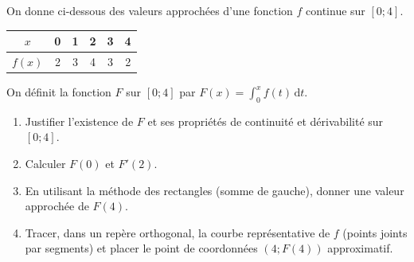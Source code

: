 \documentclass[11pt]{article}
\begin{document}
\begin{exercice}
On donne ci-dessous des valeurs approchées d'une fonction $f$ continue sur $[0; 4]$.

\begin{center}
\begin{tabular}{|c|c|c|c|c|c|}
\hline
$x$ & 0 & 1 & 2 & 3 & 4 \\
\hline
$f(x)$ & 2 & 3 & 4 & 3 & 2 \\
\hline
\end{tabular}
\end{center}

On définit la fonction $F$ sur $[0; 4]$ par $F(x) = \int_0^x f(t)\,\mathrm{d}t$.
\begin{enumerate}
    \item Justifier l'existence de $F$ et ses propriétés de continuité et dérivabilité sur $[0; 4]$.
    \item Calculer $F(0)$ et $F'(2)$.
    \item En utilisant la méthode des rectangles (somme de gauche), donner une valeur approchée de $F(4)$.
    \item Tracer, dans un repère orthogonal, la courbe représentative de $f$ (points joints par segments) et placer le point de coordonnées $(4; F(4))$ approximatif.
\end{enumerate}
\end{exercice}
\end{document}
